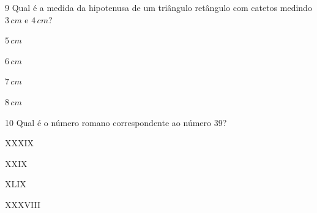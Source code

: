 
\num{9}  Qual é a medida da hipotenusa de um triângulo retângulo com catetos
medindo $3\,cm$ e $4\,cm$?

\begin{escolha}
\item $5\,cm$
\item $6\,cm$
\item $7\,cm$
\item $8\,cm$
\end{escolha}



\num{10} Qual é o número romano correspondente ao número $39$?

\begin{escolha}
\item XXXIX 
\item XXIX 
\item XLIX 
\item XXXVIII
\end{escolha}

